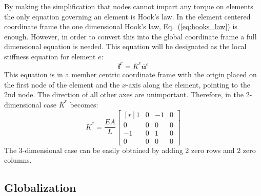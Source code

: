 \documentclass{article}
\begin{document}
By making the simplification that nodes cannot impart any torque on elements
the only equation governing an element is Hook's law.  In the element centered
coordinate frame the one dimensional Hook's law, Eq.~(\ref{eq:hooks_law}) is
enough.  However, in order to convert this into the global coordinate frame a
full dimensional equation is needed.  This equation will be designated as the
local stiffness equation for element $e$:
\begin{equation}
    \overline{\mathbf{f}}^e=\overline{K}^e\overline{\mathbf{u}}^e
    \label{eq:local_stiffness_equation}
\end{equation}
This equation is in a member centric coordinate frame with the origin placed
on the first node of the element and the $x$-axis along the element, pointing
to the 2nd node.  The direction of all other axes are unimportant.  Therefore,
in the 2-dimensional case $\overline{K}^e$ becomes:
\begin{equation}
    \overline{K}^e=\frac{EA}{L}\begin{bmatrix*}[r]
        1&0&-1&0\\
        0&0&0&0\\
        -1&0&1&0\\
        0&0&0&0
    \end{bmatrix*} \label{eq:kbar}
\end{equation}
The 3-dimensional case can be easily obtained by adding 2 zero rows and 2 zero
columns.




\subsection{Globalization}
\end{document}
